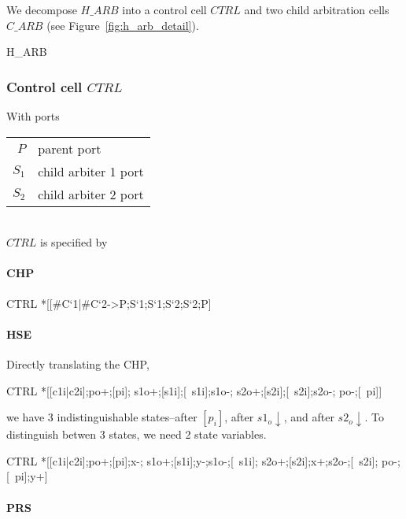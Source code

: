 \documentclass{article}
\begin{document}
We decompose $H\!\_ARB$ into a control cell $CTRL$ and two child arbitration cells $C\_ARB$ (see Figure~\ref{fig:h_arb_detail}).

\begin{csp}
H\_ARB
\end{csp}

\subsubsection{Control cell $CTRL$}
With ports

\begin{tabular}[]{rl}
$P$ & parent port \\
$S_1$ & child arbiter 1 port \\
$S_2$ & child arbiter 2 port \\
\end{tabular} \\

\noindent $CTRL$ is specified by

\paragraph{CHP} 

\begin{csp}
CTRL\equiv
  *[[#{C`1}|#{C`2}->P;S`1;S`1;S`2;S`2;P]
\end{csp}

\paragraph{HSE} 

Directly translating the CHP,

\begin{hse}
CTRL\equiv
  *[[c1i|c2i];po+;[pi];
    s1o+;[s1i];[~s1i];s1o-;
    s2o+;[s2i];[~s2i];s2o-;
    po-;[~pi]]
\end{hse}

\noindent we have 3 indistinguishable states--after $[p_i]$, after $s1_o\!\downarrow$, and after $s2_o\!\downarrow$. To distinguish betwen 3 states, we need 2 state variables.

\begin{hse}
CTRL\equiv
  *[[c1i|c2i];po+;[pi];x-;
    s1o+;[s1i];y-;s1o-;[~s1i];
    s2o+;[s2i];x+;s2o-;[~s2i];
    po-;[~pi];y+]
\end{hse}

\paragraph{PRS}
\end{document}
